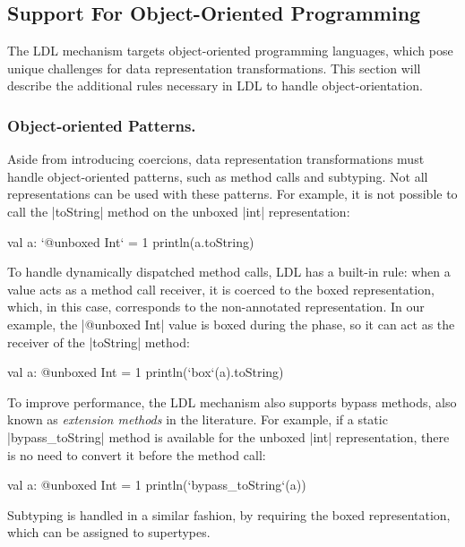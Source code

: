\subsection{Support For Object-Oriented Programming}
\label{sec:ldl:oo-patterns}

The LDL mechanism targets object-oriented programming languages, which pose unique challenges for data representation transformations. This section will describe the additional rules necessary in LDL to handle object-orientation.

\subsubsection{Object-oriented Patterns.} Aside from introducing coercions, data representation transformations must handle object-oriented patterns, such as method calls and subtyping. Not all representations can be used with these patterns. For example, it is not possible to call the |toString| method on the unboxed |int| representation:

\begin{lstlisting-nobreak}
val a: `@unboxed Int` = 1
println(a.toString)
\end{lstlisting-nobreak}

To handle dynamically dispatched method calls, LDL has a built-in rule: when a value acts as a method call receiver, it is coerced to the boxed representation, which, in this case, corresponds to the non-annotated representation. In our example, the |@unboxed Int| value is boxed during the \coerce{} phase, so it can act as the receiver of the |toString| method:

\begin{lstlisting-nobreak}
val a: @unboxed Int = 1
println(`box`(a).toString)
\end{lstlisting-nobreak}

To improve performance, the LDL mechanism also supports bypass methods, also known as 
\emph{extension methods} in the literature. For example, if a static |bypass_toString| method is available for the unboxed |int| representation, there is no need to convert it before the method call:

\begin{lstlisting-nobreak}
val a: @unboxed Int = 1
println(`bypass_toString`(a))
\end{lstlisting-nobreak}

Subtyping is handled in a similar fashion, by requiring the boxed representation, which can be assigned to supertypes.

